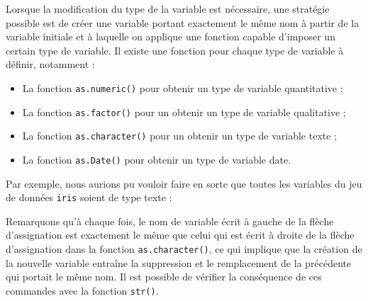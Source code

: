 \documentclass[
  letterpaper,
]{book}
\newenvironment{Shaded}{\begin{snugshade}}{\end{snugshade}}
\newcommand{\AttributeTok}[1]{\textcolor[rgb]{0.40,0.45,0.13}{#1}}
\newcommand{\FunctionTok}[1]{\textcolor[rgb]{0.28,0.35,0.67}{#1}}
\newcommand{\NormalTok}[1]{\textcolor[rgb]{0.00,0.23,0.31}{#1}}
\newcommand{\OtherTok}[1]{\textcolor[rgb]{0.00,0.23,0.31}{#1}}
\newcommand{\SpecialCharTok}[1]{\textcolor[rgb]{0.37,0.37,0.37}{#1}}
\providecommand{\tightlist}{%
  \setlength{\itemsep}{0pt}\setlength{\parskip}{0pt}}\usepackage{longtable,booktabs,array}
\begin{document}
Lorsque la modification du type de la variable est nécessaire, une
stratégie possible est de créer une variable portant exactement le même
nom à partir de la variable initiale et à laquelle on applique une
fonction capable d'imposer un certain type de variable. Il existe une
fonction pour chaque type de variable à définir, notamment :

\begin{itemize}
\tightlist
\item
  La fonction \texttt{as.numeric()} pour obtenir un type de variable
  quantitative ;
\item
  La fonction \texttt{as.factor()} pour un obtenir un type de variable
  qualitative ;
\item
  La fonction \texttt{as.character()} pour un obtenir un type de
  variable texte ;
\item
  La fonction \texttt{as.Date()} pour obtenir un type de variable date.
\end{itemize}

Par exemple, nous aurions pu vouloir faire en sorte que toutes les
variables du jeu de données \texttt{iris} soient de type texte :

\begin{Shaded}
\end{Shaded}

Remarquons qu'à chaque fois, le nom de variable écrit à gauche de la
flèche d'assignation est exactement le même que celui qui est écrit à
droite de la flèche d'assignation dans la fonction
\texttt{as.character()}, ce qui implique que la création de la nouvelle
variable entraîne la suppression et le remplacement de la précédente qui
portait le même nom. Il est possible de vérifier la conséquence de ces
commandes avec la fonction \texttt{str()}.
\end{document}
